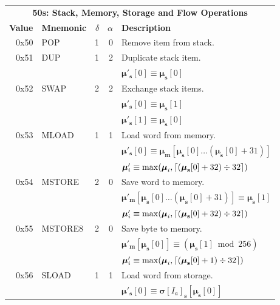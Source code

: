 \documentclass[9pt,oneside]{amsart}
\DeclarePairedDelimiter{\ceil}{\lceil}{\rceil}
\begin{document}
\begin{tabular*}{\columnwidth}[h]{rlrrl}
\toprule
\multicolumn{5}{c}{\textbf{50s: Stack, Memory, Storage and Flow Operations}} \vspace{5pt} \\
\textbf{Value} & \textbf{Mnemonic} & $\delta$ & $\alpha$ & \textbf{Description} \vspace{5pt} \\
0x50 & {\small POP} & 1 & 0 & Remove item from stack. \\
\midrule
0x51 & {\small DUP} & 1 & 2 & Duplicate stack item. \\
&&&& $\boldsymbol{\mu}'_\mathbf{s}[0] \equiv \boldsymbol{\mu}_\mathbf{s}[0]$ \\
\midrule
0x52 & {\small SWAP} & 2 & 2 & Exchange stack items. \\
&&&& $\boldsymbol{\mu}'_\mathbf{s}[0] \equiv \boldsymbol{\mu}_\mathbf{s}[1]$ \\
&&&& $\boldsymbol{\mu}'_\mathbf{s}[1] \equiv \boldsymbol{\mu}_\mathbf{s}[0]$ \\
\midrule
0x53 & {\small MLOAD} & 1 & 1 & Load word from memory. \\
&&&& $\boldsymbol{\mu}'_\mathbf{s}[0] \equiv \boldsymbol{\mu}_\mathbf{m}[\boldsymbol{\mu}_\mathbf{s}[0] \dots (\boldsymbol{\mu}_\mathbf{s}[0] + 31) ]$ \\
&&&& $\boldsymbol{\mu}'_i \equiv \max(\boldsymbol{\mu}_i, \ceil{ (\boldsymbol{\mu}_\mathbf{s}[0] + 32) \div 32 })$ \\
\midrule
0x54 & {\small MSTORE} & 2 & 0 & Save word to memory. \\
&&&& $\boldsymbol{\mu}'_\mathbf{m}[ \boldsymbol{\mu}_\mathbf{s}[0] \dots (\boldsymbol{\mu}_\mathbf{s}[0] + 31) ] \equiv \boldsymbol{\mu}_\mathbf{s}[1]$ \\
&&&& $\boldsymbol{\mu}'_i \equiv \max(\boldsymbol{\mu}_i, \ceil{ (\boldsymbol{\mu}_\mathbf{s}[0] + 32) \div 32 })$ \\
\midrule
0x55 & {\small MSTORE8} & 2 & 0 & Save byte to memory. \\
&&&& $\boldsymbol{\mu}'_\mathbf{m}[ \boldsymbol{\mu}_\mathbf{s}[0] ] \equiv (\boldsymbol{\mu}_\mathbf{s}[1] \bmod 256) $ \\
&&&& $\boldsymbol{\mu}'_i \equiv \max(\boldsymbol{\mu}_i, \ceil{ (\boldsymbol{\mu}_\mathbf{s}[0] + 1) \div 32 })$ \\
\midrule
0x56 & {\small SLOAD} & 1 & 1 & Load word from storage. \\
&&&& $\boldsymbol{\mu}'_\mathbf{s}[0] \equiv \boldsymbol{\sigma}[I_a]_\mathbf{s}[\boldsymbol{\mu}_\mathbf{s}[0]]$ \\

\end{tabular*}
\end{document}
